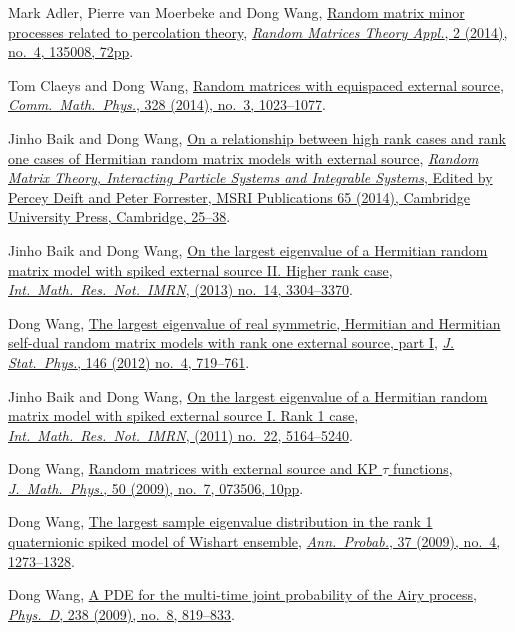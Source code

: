 \documentclass[12pt,a4paper]{article}
\begin{document}
\begin{etaremune}
\item 
  Mark Adler, Pierre van Moerbeke and Dong Wang,
  \href{http://arxiv.org/abs/1301.7017}{Random matrix minor processes related to percolation theory}, \href{https://doi.org/10.1142/S2010326313500081}{\textit{Random Matrices Theory Appl.}, 2 (2014), no.\ 4, 135008, 72pp}.
\item 
  Tom Claeys and Dong Wang,
  \href{http://arxiv.org/abs/1212.3768}{Random matrices with equispaced external source}, \href{https://doi.org/10.1007/s00220-014-1988-y}{\textit{Comm.\ Math.\ Phys.}, 328 (2014), no.\ 3, 1023--1077}.
\item Jinho Baik and Dong Wang,
  \href{http://arxiv.org/abs/1207.0389}{On a relationship between high rank cases and rank one cases of Hermitian random matrix models with external source}, \href{http://www.cambridge.org/asia/catalogue/catalogue.asp?isbn=9781107079922}{\textit{Random Matrix Theory, Interacting Particle Systems and Integrable Systems}, Edited by Percey Deift and Peter Forrester, MSRI Publications 65 (2014), Cambridge University Press, Cambridge, 25--38}.
\item Jinho Baik and Dong Wang,
  \href{http://arxiv.org/abs/1104.2915}{On the largest eigenvalue of a Hermitian random matrix model with spiked external source II. Higher rank case}, \href{https://doi.org/10.1093/imrn/rns136}{\textit{Int.\ Math.\ Res.\ Not.\ IMRN}, (2013) no.\ 14, 3304--3370}.
\item Dong Wang,
  \href{http://arxiv.org/abs/1012.4144}{The largest eigenvalue of real symmetric, Hermitian and Hermitian self-dual random matrix models with rank one external source, part I}, \href{https://doi.org/10.1007/s10955-012-0417-x}{\textit{J. Stat.\ Phys.}, 146 (2012) no.\ 4, 719--761}.
\item Jinho Baik and  Dong Wang,
  \href{http://arxiv.org/abs/1010.4604}{On the largest eigenvalue of a Hermitian random matrix model with spiked external source I. Rank 1 case}, \href{https://doi.org/10.1093/imrn/rnq257}{\textit{Int.\ Math.\ Res.\ Not.\ IMRN}, (2011) no.\ 22, 5164--5240}.
\item Dong Wang,
  \href{http://arxiv.org/abs/0810.0280}{Random matrices with external source and KP $\tau$ functions}, \href{https://doi.org/10.1063/1.3167802}{\textit{J.\ Math.\ Phys.}, 50 (2009), no.\ 7, 073506, 10pp}.
\item Dong Wang,
 \href{http://arxiv.org/abs/0711.2722}{The largest sample eigenvalue distribution in the rank 1 quaternionic spiked model of Wishart ensemble}, \href{https://doi.org/10.1214/08-AOP432}{\textit{Ann.\ Probab.}, 37 (2009), no.\ 4, 1273--1328}.
\item Dong Wang,
  \href{http://arxiv.org/abs/0711.3797}{A PDE for the multi-time joint probability of the Airy process}, \href{https://doi.org/10.1016/j.physd.2009.02.007}{\textit{Phys.\ D}, 238 (2009), no.\ 8, 819--833}.
\end{etaremune}
\end{document}
